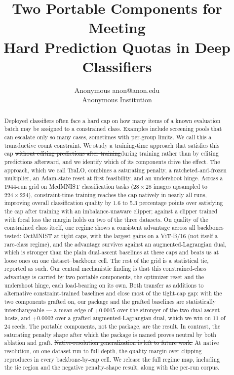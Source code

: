 \documentclass[10pt]{article}
\title{Two Portable Components for Meeting\\
Hard Prediction Quotas in Deep Classifiers}
\author{\name Anonymous \email anon@anon.edu \\
      \addr Anonymous Institution}
\newcommand{\del}[1]{{\color{red}\sout{#1}}}
\begin{document}
\maketitle

\begin{abstract}
Deployed classifiers often face a hard cap on how many items of a known
evaluation batch may be assigned to a constrained class. Examples include
screening pools that can escalate only so many cases, sometimes with
per-group limits. We call this a transductive count constraint. We study
a training-time approach that satisfies this cap \del{without editing
predictions after training}{\color{blue}during training rather than by editing
predictions afterward}, and we identify which of its components
drive the effect. The approach, which we call TraLO, combines a
saturating penalty, a ratcheted-and-frozen multiplier, an Adam-state
reset at first feasibility, and an undershoot hinge. Across a $1944$-run
grid on MedMNIST classification tasks ($28{\times}28$ images upsampled to
$224{\times}224$), constraint-time training reaches the cap natively in
nearly all runs, improving overall classification quality by $1.6$ to
$5.3$ percentage points over satisfying the cap after training
{\color{blue}with an imbalance-unaware clipper; against a clipper trained with
focal loss the margin holds on two of the three datasets}. On
quality of the constrained class itself, one regime shows a consistent
advantage across all backbones tested: OctMNIST at tight caps, with the
largest gains on a ViT{\color{blue}-B/16} (not itself a rare-class regime){\color{blue}, and the
advantage survives against an augmented-Lagrangian dual, which is stronger than
the plain dual-ascent baselines at these caps and beats us at loose ones on one
dataset--backbone cell}. The rest of
the grid is a statistical tie, reported as such. Our central
mechanistic finding is that this constrained-class advantage is carried
by two portable components, the optimizer reset and the undershoot
hinge{\color{blue}, each load-bearing on its own}. Both transfer as additions to
alternative constraint-trained
baselines and close most of the tight-cap gap{\color{blue}: with the two
components grafted on, our package and the grafted baselines are statistically
interchangeable --- a mean edge of $+0.0015$ over the stronger of the two
dual-ascent hosts, and $+0.0002$ over a grafted augmented-Lagrangian dual, which
we win on $11$ of $24$ seeds. The portable
components, not the package, are the result}. In contrast, the
saturating penalty shape after which the package is named proves neutral
by both ablation and graft. \del{Native-resolution generalization is left to
future work.}
{\color{blue}At native resolution, on one dataset run to full depth, the
quality margin over clipping reproduces in every backbone-by-cap cell.}
We release the full regime map, including the tie region
and the negative penalty-shape result, along with the per-run corpus.
\end{abstract}
\end{document}
